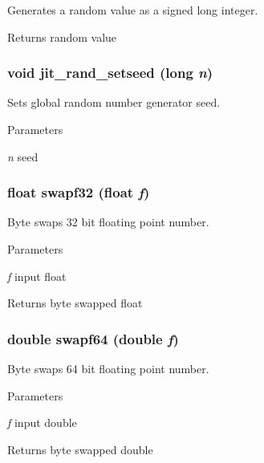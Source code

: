 Generates a random value as a signed long integer. \begin{DoxyReturn}{Returns}
random value 
\end{DoxyReturn}
\hypertarget{group__utilitymod_gaa3768df212e917ec778bf1a8af191c27}{
\subsubsection[{jit\_\-rand\_\-setseed}]{\setlength{\rightskip}{0pt plus 5cm}void jit\_\-rand\_\-setseed (long {\em n})}}
\label{group__utilitymod_gaa3768df212e917ec778bf1a8af191c27}


Sets global random number generator seed. 
\begin{DoxyParams}{Parameters}
\item[{\em n}]seed \end{DoxyParams}
\hypertarget{group__utilitymod_ga830cf9c4a9f6e87767dabf29a3610181}{
\subsubsection[{swapf32}]{\setlength{\rightskip}{0pt plus 5cm}float swapf32 (float {\em f})}}
\label{group__utilitymod_ga830cf9c4a9f6e87767dabf29a3610181}


Byte swaps 32 bit floating point number. 
\begin{DoxyParams}{Parameters}
\item[{\em f}]input float\end{DoxyParams}
\begin{DoxyReturn}{Returns}
byte swapped float 
\end{DoxyReturn}
\hypertarget{group__utilitymod_ga8eaccf938b9088a33cf4b794821ce270}{
\subsubsection[{swapf64}]{\setlength{\rightskip}{0pt plus 5cm}double swapf64 (double {\em f})}}
\label{group__utilitymod_ga8eaccf938b9088a33cf4b794821ce270}


Byte swaps 64 bit floating point number. 
\begin{DoxyParams}{Parameters}
\item[{\em f}]input double\end{DoxyParams}
\begin{DoxyReturn}{Returns}
byte swapped double 
\end{DoxyReturn}
